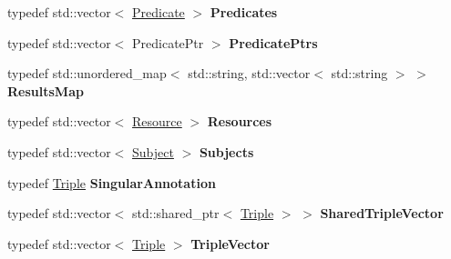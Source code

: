 \begin{DoxyCompactItemize}
\item 
\mbox{\label{namespaceomexmeta_af916f97aa87900541cf46ca66139fc14}} 
typedef std\+::vector$<$ \hyperlink{classomexmeta_1_1Predicate}{Predicate} $>$ {\bfseries Predicates}
\item 
\mbox{\label{namespaceomexmeta_a84ba746aac1e9ee5c7256a2f2f393a41}} 
typedef std\+::vector$<$ Predicate\+Ptr $>$ {\bfseries Predicate\+Ptrs}
\item 
\mbox{\label{namespaceomexmeta_a08a1cea39a93f919e8c481f1307e9d64}} 
typedef std\+::unordered\+\_\+map$<$ std\+::string, std\+::vector$<$ std\+::string $>$ $>$ {\bfseries Results\+Map}
\item 
\mbox{\label{namespaceomexmeta_a211f941200e84d6258b6980a1101a978}} 
typedef std\+::vector$<$ \hyperlink{classomexmeta_1_1Resource}{Resource} $>$ {\bfseries Resources}
\item 
\mbox{\label{namespaceomexmeta_a55c310aac91280285453df83fafa7d69}} 
typedef std\+::vector$<$ \hyperlink{classomexmeta_1_1Subject}{Subject} $>$ {\bfseries Subjects}
\item 
\mbox{\label{namespaceomexmeta_a7fc6fa4ba32424705fe4953ee297a795}} 
typedef \hyperlink{classomexmeta_1_1Triple}{Triple} {\bfseries Singular\+Annotation}
\item 
\mbox{\label{namespaceomexmeta_a866d550d1c1d6bdadd778a73fef571bb}} 
typedef std\+::vector$<$ std\+::shared\+\_\+ptr$<$ \hyperlink{classomexmeta_1_1Triple}{Triple} $>$ $>$ {\bfseries Shared\+Triple\+Vector}
\item 
\mbox{\label{namespaceomexmeta_a0591b044477ac1101740fd7db67088bc}} 
typedef std\+::vector$<$ \hyperlink{classomexmeta_1_1Triple}{Triple} $>$ {\bfseries Triple\+Vector}
\end{DoxyCompactItemize}
